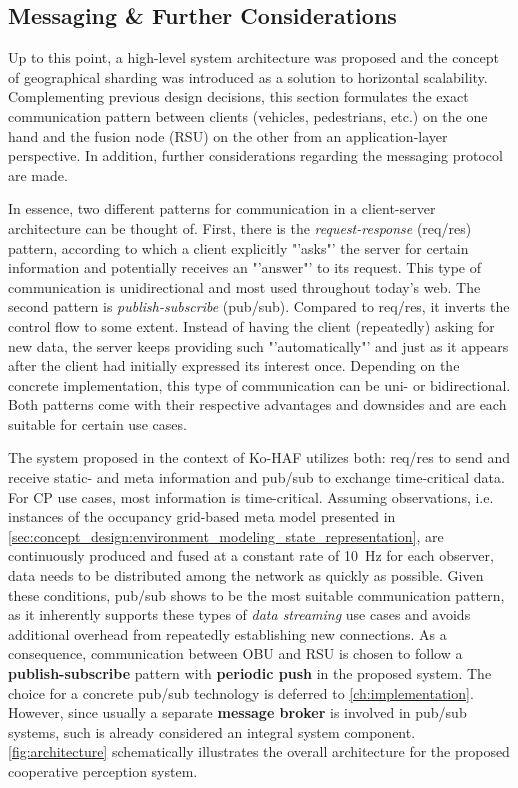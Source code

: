 \subsection{Messaging \& Further Considerations}
\label{subsec:concept_design:messaging_further_considerations}
Up to this point, a high-level system architecture was proposed and the concept of geographical sharding was introduced as a solution to horizontal scalability. Complementing previous design decisions, this section formulates the exact communication pattern between clients (vehicles, pedestrians, etc.) on the one hand and the fusion node (RSU) on the other from an application-layer perspective. In addition, further considerations regarding the messaging protocol are made.
\par
\bigskip

In essence, two different patterns for communication in a client-server architecture can be thought of. First, there is the \textit{request-response} (req/res) pattern, according to which a client explicitly "'asks"' the server for certain information and potentially receives an "'answer"' to its request. This type of communication is unidirectional and most used throughout today's web. The second pattern is \textit{publish-subscribe} (pub/sub). Compared to req/res, it inverts the control flow to some extent. Instead of having the client (repeatedly) asking for new data, the server keeps providing such "'automatically"' and just as it appears after the client had initially expressed its interest once. Depending on the concrete implementation, this type of communication can be uni- or bidirectional. Both patterns come with their respective advantages and downsides and are each suitable for certain use cases.

The system proposed in the context of Ko-HAF \cite{Hohm2019} utilizes both: req/res to send and receive static- and meta information and pub/sub to exchange time-critical data. For CP use cases, most information is time-critical. Assuming observations, i.e. instances of the occupancy grid-based meta model presented in \cref{sec:concept_design:environment_modeling_state_representation}, are continuously produced and fused at a constant rate of \SI{10}{\hertz} for each observer, data needs to be distributed among the network as quickly as possible. Given these conditions, pub/sub shows to be the most suitable communication pattern, as it inherently supports these types of \textit{data streaming} use cases and avoids additional overhead from repeatedly establishing new connections. As a consequence, communication between OBU and RSU is chosen to follow a \textbf{publish-subscribe} pattern with \textbf{periodic push} in the proposed system. The choice for a concrete pub/sub technology is deferred to \cref{ch:implementation}. However, since usually a separate \textbf{message broker} is involved in pub/sub systems, such is already considered an integral system component. \cref{fig:architecture} schematically illustrates the overall architecture for the proposed cooperative perception system.

